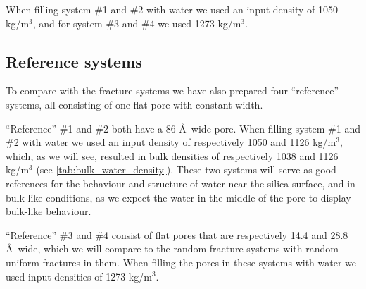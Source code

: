 When filling system \#1 and \#2 with water we used an input density of 1050 kg/m$^3$, and for system \#3 and \#4 we used 1273 kg/m$^3$.


\subsection*{Reference systems}
To compare with the fracture systems we have also prepared four ``reference'' systems, all consisting of one flat pore with constant width. 

``Reference'' \#1 and \#2 both have a 86 \AA\ wide pore. When filling system \#1 and \#2 with water we used an input density of respectively 1050 and 1126 kg/m$^3$, which, as we will see, resulted in bulk densities of respectively 1038 and 1126 kg/m$^3$ (see \cref{tab:bulk_water_density}). These two systems will serve as good references for the behaviour and structure of water near the silica surface, and in bulk-like conditions, as we expect the water in the middle of the pore to display bulk-like behaviour.%
%
%

``Reference'' \#3 and \#4 consist of flat pores that are respectively 14.4 and 28.8 \AA\ wide, which we will compare to the random fracture systems with random uniform fractures in them. When filling the pores in these systems with water we used input densities of 1273 kg/m$^3$. %